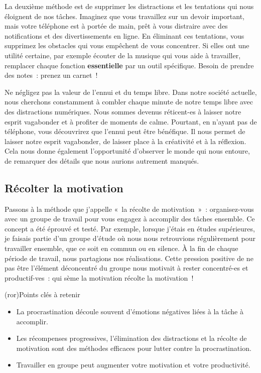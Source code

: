\documentclass[a4paper, 12pt, garamond]{book}
\begin{document}
La deuxième méthode est de supprimer les distractions et les tentations qui nous
éloignent de nos tâches. Imaginez que vous travaillez sur un devoir important,
mais votre téléphone est à portée de main, prêt à vous distraire avec des
notifications et des divertissements en ligne. En éliminant ces tentations, vous
supprimez les obstacles qui vous empêchent de vous concentrer. Si elles ont une
utilité certaine, par exemple écouter de la musique qui vous aide à travailler,
remplacer chaque fonction \textbf{essentielle} par un outil spécifique. Besoin
de prendre des notes~: prenez un carnet~!

Ne négligez pas la valeur de l'ennui et du temps libre. Dans notre société
actuelle, nous cherchons constamment à combler chaque minute de notre temps
libre avec des distractions numériques. Nous sommes devenus réticent-es à
laisser notre esprit vagabonder et à profiter de moments de calme. Pourtant, en
n'ayant pas de téléphone, vous découvrirez que l'ennui peut être bénéfique. Il
nous permet de laisser notre esprit vagabonder, de laisser place à la créativité
et à la réflexion. Cela nous donne également l'opportunité d'observer le monde
qui nous entoure, de remarquer des détails que nous aurions autrement manqués.

\subsection{Récolter la motivation}

Passons à la méthode que j'appelle «~la récolte de motivation~»~: organisez-vous
avec un groupe de travail pour vous engagez à accomplir des tâches ensemble.
Ce concept a été éprouvé et testé. Par exemple, lorsque j'étais en études
supérieures, je faisais partie d'un groupe d'étude où nous nous retrouvions
régulièrement pour travailler ensemble, que ce soit en commun ou en silence. À
la fin de chaque période de travail, nous partagions nos réalisations. Cette
pression positive de ne pas être l'élément déconcentré du groupe nous motivait à
rester concentré-es et productif-ves~: qui sème la motivation récolte la
motivation~!

\begin{tcb}(ror){Points clés à retenir}
	\begin{itemize}
		\item La procrastination découle souvent d'émotions négatives liées à la
		      tâche à accomplir.
		\item Les récompenses progressives, l'élimination des distractions et la
		      récolte de motivation sont des méthodes efficaces pour lutter contre
		      la procrastination.
		\item Travailler en groupe peut augmenter votre motivation et votre
		      productivité.
	\end{itemize}

\end{tcb}
\end{document}
